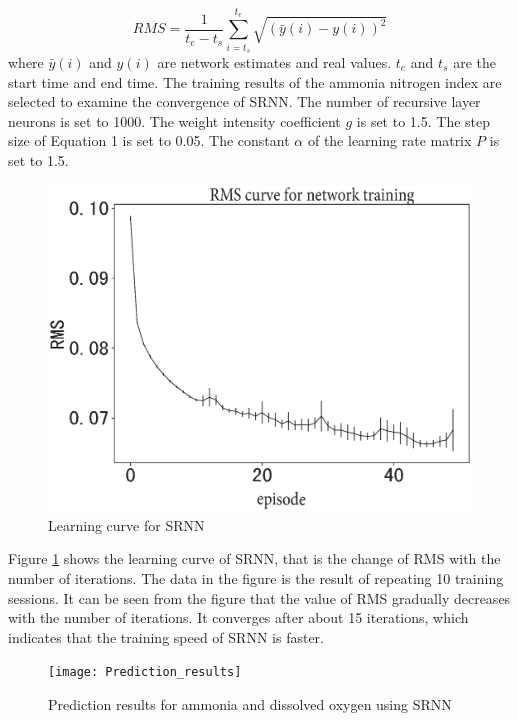 \documentclass[runningheads]{llncs}
\begin{document}
\begin{equation}
RMS=  \frac{1}{t_e-t_s}\sum_{i=t_s}^{t_e}\sqrt{(\bar y(i)- y(i))^2}
\end{equation}
where $\bar y(i)$ and $y(i)$ are network estimates and real values. 
$t_e$ and $t_s$ are the start time and end time. The training results of the ammonia nitrogen index are selected 
to examine the convergence of SRNN. The number of recursive layer neurons is set to 1000.
The weight intensity coefficient $g$ is set to 1.5. 
The step size of Equation 1 is set to 0.05. 
The constant $\alpha$ of the learning rate matrix $P$ is set to 1.5.
\begin{figure}[htbp]
\centering
\includegraphics[width=\columnwidth]{Learning_curve}
\caption{Learning curve for SRNN}
\label{Learning curve for SRNN}
\end{figure}

Figure \ref{Learning curve for SRNN} shows the learning curve of SRNN, that is the change of 
RMS with the number of iterations. The data in the figure is the 
result of repeating 10 training sessions. 
It can be seen from the figure that the value of RMS 
gradually decreases with the number of iterations. 
It converges after about 15 iterations, which indicates that the training 
speed of SRNN is faster.

\begin{figure}[htbp]
\centering
\texttt{[image: Prediction\_results]}
\caption{Prediction results for ammonia and dissolved oxygen using SRNN}
\label{Prediction results for ammonia and dissolved oxygen using SRNN}
\end{figure}
\end{document}
